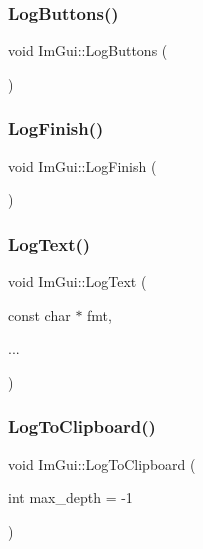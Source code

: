 \hypertarget{namespace_im_gui_a7bd295da4be19bab98262c76fcaeb4fb}{}\label{namespace_im_gui_a7bd295da4be19bab98262c76fcaeb4fb} 
\subsubsection{\texorpdfstring{Log\+Buttons()}{LogButtons()}}
{\footnotesize\ttfamily void Im\+Gui\+::\+Log\+Buttons (\begin{DoxyParamCaption}{ }\end{DoxyParamCaption})}

\hypertarget{namespace_im_gui_a2ebcd048d1ca025fb972e1c2e920e3f3}{}\label{namespace_im_gui_a2ebcd048d1ca025fb972e1c2e920e3f3} 
\subsubsection{\texorpdfstring{Log\+Finish()}{LogFinish()}}
{\footnotesize\ttfamily void Im\+Gui\+::\+Log\+Finish (\begin{DoxyParamCaption}{ }\end{DoxyParamCaption})}

\hypertarget{namespace_im_gui_aa548475d8f771ab6524d73d900a41198}{}\label{namespace_im_gui_aa548475d8f771ab6524d73d900a41198} 
\subsubsection{\texorpdfstring{Log\+Text()}{LogText()}}
{\footnotesize\ttfamily void Im\+Gui\+::\+Log\+Text (\begin{DoxyParamCaption}\item[{const char $\ast$}]{fmt,  }\item[{}]{... }\end{DoxyParamCaption})}

\hypertarget{namespace_im_gui_a81add991d176834b8a6e315dfc78e4f7}{}\label{namespace_im_gui_a81add991d176834b8a6e315dfc78e4f7} 
\subsubsection{\texorpdfstring{Log\+To\+Clipboard()}{LogToClipboard()}}
{\footnotesize\ttfamily void Im\+Gui\+::\+Log\+To\+Clipboard (\begin{DoxyParamCaption}\item[{int}]{max\+\_\+depth = {\ttfamily -\/1} }\end{DoxyParamCaption})}

